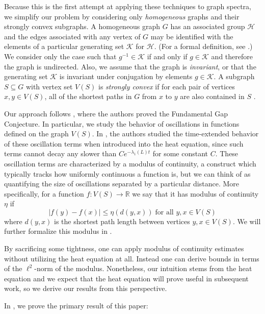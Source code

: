 Because this is the first attempt at applying these techniques to graph spectra, we simplify our problem by considering only \textit{homogeneous} graphs and their strongly convex subgraphs. A homogeneous graph $G$ has an associated group $\mathcal{H}$ and the edges associated with any vertex of $G$ may be identified with the elements of a particular generating set $\mathcal{K}$ for $\mathcal{H}$. (For a formal definition, see .) We consider only the case such that $g^{-1} \in \mathcal{K}$ if and only if $g \in \mathcal{K}$ and therefore the graph is undirected. Also, we assume that the graph is \textit{invariant}, or that the generating set $\mathcal{K}$ is invariant under conjugation by elements $g \in \mathcal{K}$. A subgraph $S \subseteq G$ with vertex set $V(S)$ is \textit{strongly convex} if for each pair of vertices $x,y \in V(S)$, all of the shortest paths in $G$ from $x$ to $y$ are also contained in $S$ \cite{Chung}. 

Our approach follows \cite{Andrews2011}, where the authors proved the Fundamental Gap Conjecture. In particular, we study the behavior of oscillations in functions defined on the graph $V(S)$. In \cite{Andrews2011}, the authors studied the time-extended behavior of these oscillation terms when introduced into the heat equation, since such terms cannot decay any slower than $C e^{-\lambda_1(L)t}$ for some constant $C$. These oscillation terms are characterized by a modulus of continuity, a construct which typically tracks how uniformly continuous a function is, but we can think of as quantifying the size of oscillations separated by a particular distance. More specifically, for a function $f:V(S)\longrightarrow \mathbb{R}$ we say that it has modulus of continuity $\eta$ if
\begin{equation*}
	\lvert f(y)-f(x) \rvert  \leq \eta(d(y,x)) \; \text{for all $y,x \in V(S)$} 
\end{equation*}
where $d(y,x)$ is the shortest path length between vertices $y,x \in V(S)$. We will further formalize this modulus in .

By sacrificing some tightness, one can apply modulus of continuity estimates without utilizing the heat equation at all. Instead one can derive bounds in terms of the $\ell^2$-norm of the modulus. Nonetheless, our intuition stems from the heat equation and we expect that the heat equation will prove useful in subsequent work, so we derive our results from this perspective.

In , we prove the primary result of this paper: 

